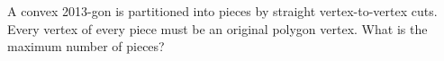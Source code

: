 A convex 2013-gon is partitioned into pieces by straight vertex-to-vertex cuts. Every vertex of every piece must be an original polygon vertex. What is the maximum number of pieces?
